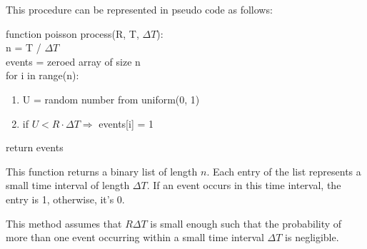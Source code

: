 This procedure can be represented in pseudo code as follows:

\begin{mdframed}[backgroundcolor=green_background, linecolor=black, linewidth=2pt, frametitle=\textbf{Pseudo-code}] \label{pscode:poisson-sample}

function poisson process(R, T, $ \Delta T $): \\
  n = T / $ \Delta T $ \\
  events = zeroed array of size n \\
  for i in range(n):

\begin{enumerate}
    \item U = random number from uniform(0, 1)

    \item if $ U < R \cdot \Delta T \Rightarrow $ events[i] = 1
\end{enumerate}

return events

\end{mdframed}

This function returns a binary list of length $n$. Each entry of the list represents a small time interval of length $\Delta T$. If an event occurs in this time interval, the entry is 1, otherwise, it's 0.

This method assumes that $R \Delta T$ is small enough such that the probability of more than one event occurring within a small time interval $\Delta T$ is negligible.